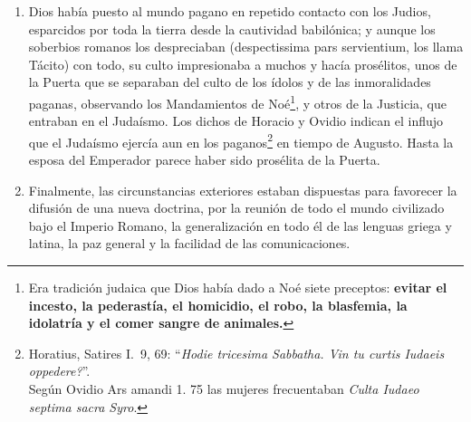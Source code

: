 \raggedbottom{} \documentclass[12pt, a4paper, openany]{book} %
\begin{document}
\begin{enumerate}
  \item Dios había puesto al mundo pagano en repetido contacto con los Judios, esparcidos por toda la tierra desde la cautividad babilónica; y aunque los soberbios romanos los despreciaban (despectissima pars servientium, los llama Tácito) con todo, su culto impresionaba a muchos y hacía prosélitos, unos de la Puerta que se separaban del culto de los ídolos y de las inmoralidades paganas, observando los Mandamientos de Noé\footnote{Era tradición judaica que Dios había dado a Noé siete preceptos: \textbf{evitar el incesto, la pederastía, el homicidio, el robo, la blasfemia, la idolatría y el comer sangre de animales.}}, y otros de la Justicia, que entraban en el Judaísmo. Los dichos de Horacio y Ovidio indican el influjo que el Judaísmo ejercía aun en los paganos\footnote{Horatius, Satires I.\ 9, 69: ``\textit{Hodie tricesima Sabbatha. Vin tu curtis Iudaeis oppedere?}''.\\ Según Ovidio Ars amandi 1. 75 las mujeres frecuentaban \textit{Culta Iudaeo septima sacra Syro}.} en tiempo de Augusto. Hasta la esposa del Emperador parece haber sido prosélita de la Puerta.
  \item Finalmente, las circunstancias exteriores estaban dispuestas para favorecer la difusión de una nueva doctrina, por la reunión de todo el mundo civilizado bajo el Imperio Romano, la generalización en todo él de las lenguas griega y latina, la paz general y la facilidad de las comunicaciones.
\end{enumerate}
\end{document}

